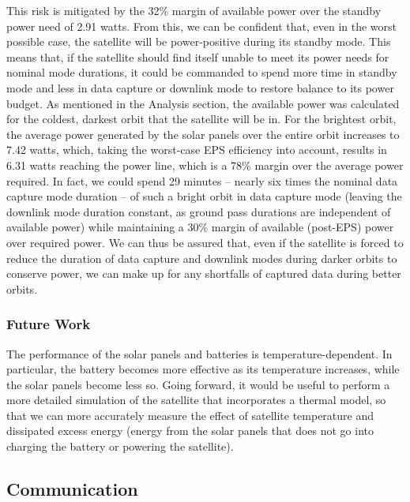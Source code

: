 \documentclass[12pt]{article}
\begin{document}
This risk is mitigated by the 32\% margin of available power over the standby power need of 2.91 watts.  From this, we can be confident that, even in the worst possible case, the satellite will be power-positive during its standby mode.  This means that, if the satellite should find itself unable to meet its power needs for nominal mode durations, it could be commanded to spend more time in standby mode and less in data capture or downlink mode to restore balance to its power budget.  As mentioned in the Analysis section, the available power was calculated for the coldest, darkest orbit that the satellite will be in.  For the brightest orbit, the average power generated by the solar panels over the entire orbit increases to 7.42 watts, which, taking the worst-case EPS efficiency into account, results in 6.31 watts reaching the power line, which is a 78\% margin over the average power required.  In fact, we could spend 29 minutes -- nearly six times the nominal data capture mode duration -- of such a bright orbit in data capture mode (leaving the downlink mode duration constant, as ground pass durations are independent of available power) while maintaining a 30\% margin of available (post-EPS) power over required power.  We can thus be assured that, even if the satellite is forced to reduce the duration of data capture and downlink modes during darker orbits to conserve power, we can make up for any shortfalls of captured data during better orbits.

			\subsubsection{Future Work}
The performance of the solar panels and batteries is temperature-dependent.  In particular, the battery becomes more effective as its temperature increases, while the solar panels become less so.  Going forward, it would be useful to perform a more detailed simulation of the satellite that incorporates a thermal model, so that we can more accurately measure the effect of satellite temperature and dissipated excess energy (energy from the solar panels that does not go into charging the battery or powering the satellite).



		\subsection{Communication}
\end{document}
